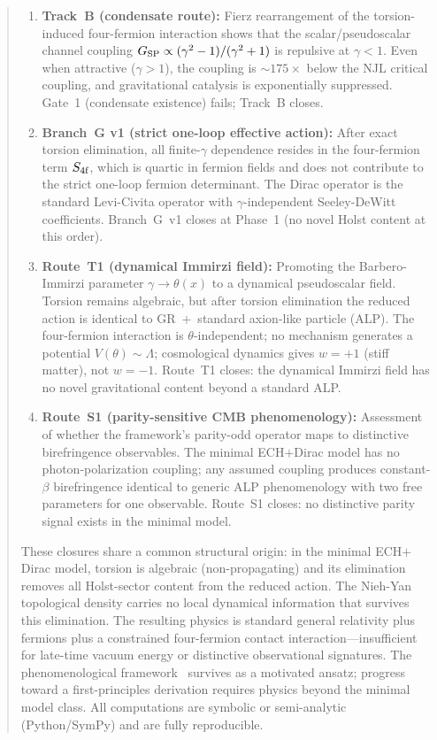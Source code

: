\documentclass[11pt,letterpaper]{article}
\newcommand{\BI}{\gamma}               %
\newcommand{\Gsp}{G_{\rm SP}}
\newcommand{\Sfour}{S_{\rm 4f}}
\begin{document}
\begin{abstract}
\begin{enumerate}[label=(\roman*)]
  \item \textbf{Track~B (condensate route):} Fierz rearrangement of the
    torsion-induced four-fermion interaction shows that the
    scalar/pseudoscalar channel coupling
    $\Gsp\propto(\BI^2-1)/(\BI^2+1)$ is repulsive at $\BI<1$.
    Even when attractive ($\BI>1$), the coupling is ${\sim}175\times$ below
    the NJL critical coupling, and gravitational catalysis is exponentially
    suppressed. Gate~1 (condensate existence) fails; Track~B closes.
  \item \textbf{Branch~G v1 (strict one-loop effective action):} After exact
    torsion elimination, all finite-$\BI$ dependence resides in the
    four-fermion term $\Sfour$, which is quartic in fermion fields and does
    not contribute to the strict one-loop fermion determinant. The Dirac
    operator is the standard Levi-Civita operator with $\BI$-independent
    Seeley-DeWitt coefficients. Branch~G~v1 closes at Phase~1 (no novel
    Holst content at this order).
  \item \textbf{Route~T1 (dynamical Immirzi field):} Promoting the
    Barbero-Immirzi parameter $\BI\to\theta(x)$ to a dynamical pseudoscalar
    field. Torsion remains algebraic, but after torsion elimination the
    reduced action is identical to GR~$+$~standard axion-like particle (ALP).
    The four-fermion interaction is $\theta$-independent; no mechanism
    generates a potential $V(\theta)\sim\Lambda$; cosmological dynamics gives
    $w=+1$ (stiff matter), not $w=-1$. Route~T1 closes: the dynamical
    Immirzi field has no novel gravitational content beyond a standard ALP.
  \item \textbf{Route~S1 (parity-sensitive CMB phenomenology):} Assessment of
    whether the framework's parity-odd operator maps to distinctive
    birefringence observables. The minimal ECH$+$Dirac model has no
    photon-polarization coupling; any assumed coupling produces constant-$\beta$
    birefringence identical to generic ALP phenomenology with two free
    parameters for one observable. Route~S1 closes: no distinctive
    parity signal exists in the minimal model.
\end{enumerate}

These closures share a common structural origin: in the minimal ECH$+$Dirac
model, torsion is algebraic (non-propagating) and its elimination removes all
Holst-sector content from the reduced action. The Nieh-Yan topological
density carries no local dynamical information that survives this elimination.
The resulting physics is standard general relativity plus fermions plus a
constrained four-fermion contact interaction---insufficient for late-time
vacuum energy or distinctive observational signatures. The phenomenological
framework~\cite{Golden2026} survives as a motivated ansatz; progress toward
a first-principles derivation requires physics beyond the minimal model class.
All computations are symbolic or semi-analytic (Python/SymPy) and are fully
reproducible.
\end{abstract}
\end{document}
